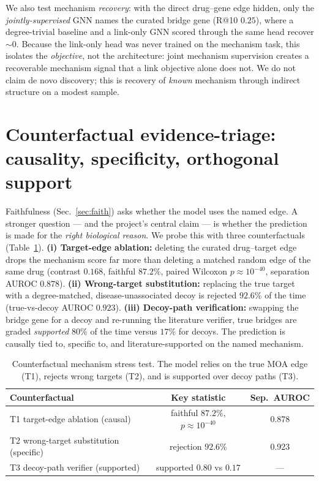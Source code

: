 \documentclass[11pt]{article}
\begin{document}
We also test mechanism \emph{recovery}: with the direct drug--gene edge hidden, only the
\emph{jointly-supervised} GNN names the curated bridge gene (R@10 $0.25$), where a
degree-trivial baseline and a link-only GNN scored through the same head recover $\sim$0.
Because the link-only head was never trained on the mechanism task, this isolates the
\emph{objective}, not the architecture: joint mechanism supervision creates a recoverable
mechanism signal that a link objective alone does not. We do not claim de novo discovery;
this is recovery of \emph{known} mechanism through indirect structure on a modest sample.

\section{Counterfactual evidence-triage: causality, specificity, orthogonal support}\label{sec:triage}
Faithfulness (Sec.~\ref{sec:faith}) asks whether the model uses the named edge. A stronger
question --- and the project's central claim --- is whether the prediction is made for the
\emph{right biological reason}. We probe this with three counterfactuals
(Table~\ref{tab:cf}). \textbf{(i) Target-edge ablation:} deleting the curated drug--target
edge drops the mechanism score far more than deleting a matched random edge of the same drug
(contrast $0.168$, faithful $87.2\%$, paired Wilcoxon $p\approx10^{-40}$, separation AUROC
$0.878$). \textbf{(ii) Wrong-target substitution:} replacing the true target with a
degree-matched, disease-unassociated decoy is rejected $92.6\%$ of the time (true-vs-decoy
AUROC $0.923$). \textbf{(iii) Decoy-path verification:} swapping the bridge gene for a decoy
and re-running the literature verifier, true bridges are graded \emph{supported} $80\%$ of
the time versus $17\%$ for decoys. The prediction is causally tied to, specific to, and
literature-supported on the named mechanism.

\begin{table}[t]
\centering\small
\caption{Counterfactual mechanism stress test. The model relies on the true MOA edge (T1),
rejects wrong targets (T2), and is supported over decoy paths (T3).}
\label{tab:cf}
\begin{tabular}{lcc}
\toprule
\textbf{Counterfactual} & \textbf{Key statistic} & \textbf{Sep.\ AUROC}\\
\midrule
T1 target-edge ablation (causal) & faithful $87.2\%$, $p\approx10^{-40}$ & 0.878\\
T2 wrong-target substitution (specific) & rejection $92.6\%$ & 0.923\\
T3 decoy-path verifier (supported) & supported $0.80$ vs $0.17$ & ---\\
\bottomrule
\end{tabular}
\end{table}
\end{document}
